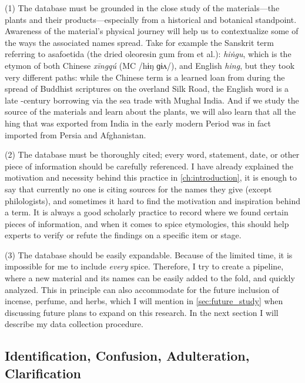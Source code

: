 (1) The database must be grounded in the close study of the materials---the plants and their products---especially from a historical and botanical standpoint. Awareness of the material's physical journey will help us to contextualize some of the ways the associated names spread. Take for example the Sanskrit term referring to asafoetida (the dried oleoresin gum from  et al.):  \textit{hiṅgu}, which is the etymon of both Chinese  \textit{xīngqú} (\gls{MC} /hɨŋ ɡɨʌ/),
and English \textit{hing}, but they took very different paths: while the Chinese term is a learned loan from during the spread of Buddhist scriptures on the overland Silk Road, the English word is a late -century borrowing via the sea trade with Mughal India. And if we study the source of the materials and learn about the plants, we will also learn that all the hing that was exported from India in the early modern Period was in fact imported from Persia and Afghanistan.

(2) The database must be thoroughly cited; every word, statement, date, or other piece of information should be carefully referenced. I have already explained the motivation and necessity behind this practice in \cref{ch:introduction}, it is enough to say that currently no one is citing sources for the names they give (except philologists), and sometimes it hard to find the motivation and inspiration behind a term. It is always a good scholarly practice to record where we found certain pieces of information, and when it comes to spice etymologies, this should help experts to verify or refute the findings on a specific item or stage.

(3) The database should be easily expandable. Because of the limited time, it is impossible for me to include \emph{every} spice. Therefore, I try to create a pipeline, where a new material and its names can be easily added to the fold, and quickly analyzed. This in principle can also accommodate for the future inclusion of incense, perfume, and herbs, which I will mention in \cref{sec:future_study} when discussing future plans to expand on this research. In the next section I will describe my data collection procedure.

\subsection{Identification, Confusion, Adulteration, Clarification}

